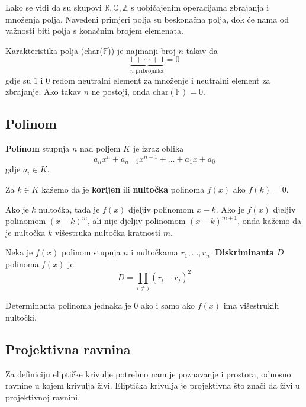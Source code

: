 \documentclass{mathos}
\begin{document}
Lako se vidi da su skupovi $\mathbb{R}, \mathbb{Q}, \mathbb{Z}$ s uobičajenim operacijama zbrajanja i množenja polja. Navedeni primjeri polja su beskonačna polja, dok će nama od važnosti biti polja s konačnim brojem elemenata.

\begin{defin}
    Karakteristika polja (char($\mathbb{F}$)) je najmanji broj $n$ takav da
    \[ \underbrace{1 + \cdots + 1}_{n \text{ pribrojnika}} = 0 \]
    gdje su $1$ i $0$ redom neutralni element za množenje i neutralni element za zbrajanje.
    Ako takav $n$ ne postoji, onda $\text{char}(\mathbb{F}) = 0$.
\end{defin}

\subsection{Polinom}
\begin{defin}[Polinom]
    \textbf{Polinom} stupnja $n$ nad poljem $K$ je izraz oblika
    \[ a_nx^n + a_{n-1}x^{n-1} + ... + a_1x + a_0 \]
    gdje $a_i \in K$.
\end{defin}
\begin{defin}
    Za $k \in K$ kažemo da je \textbf{korijen} ili \textbf{nultočka} polinoma $f(x)$ ako $f(k) = 0$.
\end{defin}
\begin{nap}
    Ako je $k$ nultočka, tada je $f(x)$ djeljiv polinomom $x - k$. Ako je $f(x)$ djeljiv polinomom $(x - k)^m$, ali nije djeljiv polinomom $(x - k)^{m+1}$, onda kažemo da je nultočka $k$ višestruka nultočka kratnosti $m$.
\end{nap}
\begin{defin}
    Neka je $f(x)$ polinom stupnja $n$ i nultočkama $r_1, ..., r_n$.
    \textbf{Diskriminanta} $D$ polinoma $f(x)$ je
    \[ D = \prod_{i \neq j}^{} (r_i - r_j)^2 \]
\end{defin}
\begin{theorem}
    \label{th:dt}
    Determinanta polinoma jednaka je $0$ ako i samo ako $f(x)$ ima višestrukih nultočki.
\end{theorem}

\subsection{Projektivna ravnina}
Za definiciju eliptičke krivulje potrebno nam je poznavanje i prostora, odnosno ravnine u kojem krivulja živi. Eliptička krivulja je projektivna što znači da živi u projektivnoj ravnini.
\end{document}
